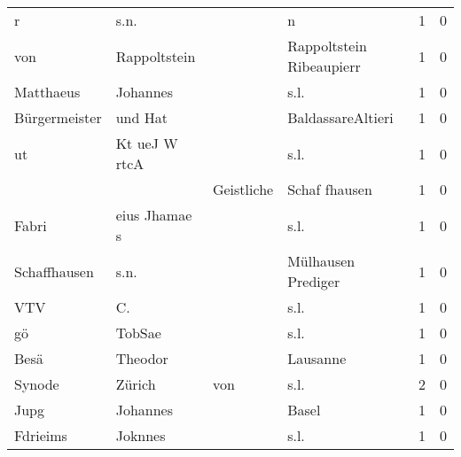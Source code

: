 \begin{tabular}{llllrr}
                        r &                               s.n. &             &                                           n &          1 &         0 \\
                      von &                       Rappoltstein &             &                    Rappoltstein Ribeaupierr &          1 &         0 \\
                Matthaeus &                           Johannes &             &                                        s.l. &          1 &         0 \\
            Bürgermeister &                            und Hat &             &                           BaldassareAltieri &          1 &         0 \\
                       ut &                      Kt ueJ W rtcA &             &                                        s.l. &          1 &         0 \\
                          &                                    &  Geistliche &                               Schaf fhausen &          1 &         0 \\
                    Fabri &                      eius Jhamae s &             &                                        s.l. &          1 &         0 \\
             Schaffhausen &                               s.n. &             &                          Mülhausen Prediger &          1 &         0 \\
                      VTV &                                 C. &             &                                        s.l. &          1 &         0 \\
                       gö &                             TobSae &             &                                        s.l. &          1 &         0 \\
                     Besä &                            Theodor &             &                                    Lausanne &          1 &         0 \\
                   Synode &                             Zürich &         von &                                        s.l. &          2 &         0 \\
                     Jupg &                           Johannes &             &                                       Basel &          1 &         0 \\
                 Fdrieims &                            Joknnes &             &                                        s.l. &          1 &         0 \\

\end{tabular}
